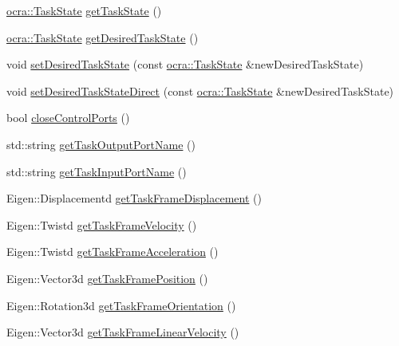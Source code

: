 \begin{DoxyCompactItemize}
\item 
\hyperlink{classocra_1_1TaskState}{ocra\+::\+Task\+State} \hyperlink{classocra__recipes_1_1TaskConnection_ae85f5279d0fe6b8c63ee9736f6308583}{get\+Task\+State} ()
\item 
\hyperlink{classocra_1_1TaskState}{ocra\+::\+Task\+State} \hyperlink{classocra__recipes_1_1TaskConnection_a655f96a4c535179184edf67a961776e7}{get\+Desired\+Task\+State} ()
\item 
void \hyperlink{classocra__recipes_1_1TaskConnection_a3a843b685459c6db2ec4b99159d57e6a}{set\+Desired\+Task\+State} (const \hyperlink{classocra_1_1TaskState}{ocra\+::\+Task\+State} \&new\+Desired\+Task\+State)
\item 
void \hyperlink{classocra__recipes_1_1TaskConnection_a4619e5f6107d88bc50165c812e219004}{set\+Desired\+Task\+State\+Direct} (const \hyperlink{classocra_1_1TaskState}{ocra\+::\+Task\+State} \&new\+Desired\+Task\+State)
\item 
bool \hyperlink{classocra__recipes_1_1TaskConnection_abc322bd749033fad00193ca63701a1f5}{close\+Control\+Ports} ()
\item 
std\+::string \hyperlink{classocra__recipes_1_1TaskConnection_add06cf3474cdf145340850854c67ccd1}{get\+Task\+Output\+Port\+Name} ()
\item 
std\+::string \hyperlink{classocra__recipes_1_1TaskConnection_ac6368ebb5b32d5319cec98fcf09d38fd}{get\+Task\+Input\+Port\+Name} ()
\item 
Eigen\+::\+Displacementd \hyperlink{classocra__recipes_1_1TaskConnection_a4595bb517cd965bc9f08f609e3e15e78}{get\+Task\+Frame\+Displacement} ()
\item 
Eigen\+::\+Twistd \hyperlink{classocra__recipes_1_1TaskConnection_a3ae346f85c5b8655698630b3f3474886}{get\+Task\+Frame\+Velocity} ()
\item 
Eigen\+::\+Twistd \hyperlink{classocra__recipes_1_1TaskConnection_a83e90c36f53ffda20f73b242c5de285b}{get\+Task\+Frame\+Acceleration} ()
\item 
Eigen\+::\+Vector3d \hyperlink{classocra__recipes_1_1TaskConnection_a263fc00649e98cfa61393f63cfe9f84a}{get\+Task\+Frame\+Position} ()
\item 
Eigen\+::\+Rotation3d \hyperlink{classocra__recipes_1_1TaskConnection_a4163584c89cc8680131bd473b9359ffb}{get\+Task\+Frame\+Orientation} ()
\item 
Eigen\+::\+Vector3d \hyperlink{classocra__recipes_1_1TaskConnection_ab0948b1336f171e607ca79ca03a466c5}{get\+Task\+Frame\+Linear\+Velocity} ()
\item 

\end{DoxyCompactItemize}
